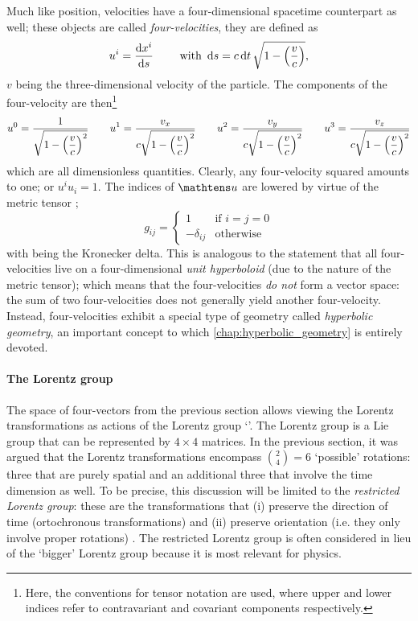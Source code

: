Much like position, velocities have a four-dimensional spacetime counterpart as well; these objects are called \emph{four-velocities}, they are defined as \cite{Landau1971}
\[ u^i = \dv{x^i}{s} \qquad \text{ with } \dd{s} = c\dd{t} \sqrt{1 - \qty(\frac{v}{c})},\]
\(v\) being the three-dimensional velocity of the particle. The components of the four-velocity  are then\footnote{Here, the conventions for tensor notation are used, where upper and lower indices refer to contravariant and covariant components respectively.}
\[ 
u^0 = \frac{\displaystyle 1}{\displaystyle \sqrt{1 - \qty(\frac{v}{c})^2}} 
\qquad  u^1 = \frac{\displaystyle v_x}{\displaystyle c\sqrt{1 - \qty(\frac{v}{c})^2}}
\qquad  u^2 = \frac{\displaystyle v_y}{\displaystyle c\sqrt{1 - \qty(\frac{v}{c})^2}}
\qquad  u^3 = \frac{\displaystyle v_z}{\displaystyle c\sqrt{1 - \qty(\frac{v}{c})^2}}
\]
which are all dimensionless quantities. Clearly, any four-velocity squared amounts to one; or \(u^i u_i = 1\). The indices of $\tens{u}$ are lowered by virtue of the metric tensor ; 
\begin{equation} 
    g_{ij} = 
    \begin{cases}
        1 & \text{if } i = j = 0\\
        -\delta_{ij} & \text{otherwise}
    \end{cases}
    \label{eq:metric_tensor}
\end{equation}
with  being the Kronecker delta. 
This is analogous to the statement that all four-velocities live on a four-dimensional \emph{unit hyperboloid} (due to the nature of the metric tensor); which means that the four-velocities \emph{do not} form a vector space: the sum of two four-velocities does not generally yield another four-velocity. Instead, four-velocities exhibit a special type of geometry called \emph{hyperbolic geometry}, an important concept to which \cref{chap:hyperbolic_geometry} is entirely devoted.

\paragraph{The Lorentz group} The space of four-vectors from the previous section allows viewing the Lorentz transformations as actions of the Lorentz group `'. The Lorentz group is a Lie group that can be represented by $4\times4$ matrices. In the previous section, it was argued that the Lorentz transformations encompass $\binom{2}{4} = 6$ `possible' rotations: three that are purely spatial and an additional three that involve the time dimension as well. To be precise, this discussion will be limited to the \emph{restricted Lorentz group}: these are the transformations that (i) preserve the direction of time (ortochronous transformations) and (ii) preserve orientation (i.e. they only involve proper rotations) \cite{Tung1985}. The restricted Lorentz group is often considered in lieu of the `bigger' Lorentz group because it is most relevant for physics.

